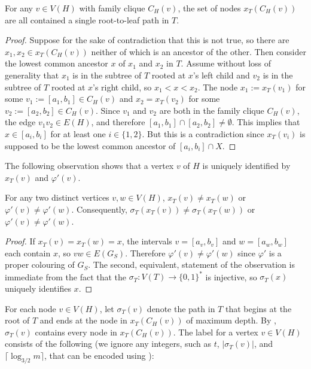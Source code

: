 \documentclass[kpfonts]{patmorin}
\begin{document}
\begin{lem}
  For any $v\in V(H)$ with family clique $C_H(v)$, the set of nodes $x_T(C_H(v))$ are all contained a single root-to-leaf path in $T$.
\end{lem}

\begin{proof}
  Suppose for the sake of contradiction that this is not true, so there are $x_1,x_2\in x_T(C_H(v))$ neither of which is an ancestor of the other.  Then consider the lowest common ancestor $x$ of $x_1$ and $x_2$ in $T$.  Assume without loss of generality that $x_1$ is in the subtree of $T$ rooted at $x$'s left child and $v_2$ is in the subtree of $T$ rooted at $x$'s right child, so $x_1<x<x_2$. The node $x_1:=x_T(v_1)$ for some $v_1:=[a_1,b_1]\in C_H(v)$ and $x_2=x_T(v_2)$ for some $v_2:=[a_2,b_2]\in C_H(v)$.  Since $v_1$ and $v_2$ are both in the family clique $C_H(v)$, the edge $v_1v_2\in E(H)$, and therefore $[a_1,b_1]\cap[a_2,b_2]\neq\emptyset$.  This implies that $x\in [a_i,b_i]$ for at least one $i\in\{1,2\}$.  But this is a contradiction since $x_T(v_i)$ is supposed to be the lowest common ancestor of $[a_i,b_i]\cap X$.
\end{proof}

The following observation shows that a vertex $v$ of $H$ is uniquely identified by $x_T(v)$ and $\varphi'(v)$.

\begin{obs}
    For any two distinct vertices $v,w\in V(H)$, $x_T(v)\neq x_T(w)$ or $\varphi'(v)\neq\varphi'(w)$.  Consequently, $\sigma_T(x_T(v))\neq \sigma_T(x_T(w))$ or $\varphi'(v)\neq\varphi'(w)$. 
\end{obs}

\begin{proof}
  If $x_T(v)=x_T(w)=x$, the intervals $v=[a_v,b_v]$ and $w=[a_w,b_w]$ each contain $x$, so $vw\in E(G_S)$.  Therefore $\varphi'(v)\neq\varphi'(w)$ since $\varphi'$ is a proper colouring of $G_S$.  The second, equivalent, statement of the observation is immediate from the fact that the $\sigma_T: V(T)\to\{0,1\}^*$ is injective, so $\sigma_T(x)$ uniquely identifies $x$.
\end{proof}

For each node $v\in V(H)$, let $\sigma_T(v)$ denote the path in $T$ that begins at the root of $T$ and ends at the node in $x_T(C_H(v))$ of maximum depth.  By , $\sigma_T(v)$ contains every node in $x_T(C_H(v))$.
The label for a vertex $v\in V(H)$ consists of the following (we ignore any integers, such as $t$, $|\sigma_T(v)|$, and $\lceil\log_{3/2} m\rceil$, that can be encoded using ):
\end{document}

